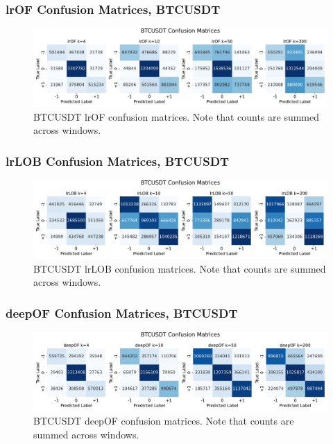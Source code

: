 \documentclass[handout]{beamer}
\begin{document}
\begin{frame}
    \frametitle{lrOF Confusion Matrices, BTCUSDT}
    \begin{figure}[htpb!]
        \centering
        \includegraphics[width=1.0\textwidth]{./images/BTCUSDT_lrOF_confusion_matrices.pdf}
        \caption{BTCUSDT lrOF confusion matrices. Note that counts are summed across windows.}
    \end{figure}
\end{frame}

\begin{frame}
    \frametitle{lrLOB Confusion Matrices, BTCUSDT}
    \begin{figure}[htpb!]
        \centering
        \includegraphics[width=1.0\textwidth]{./images/BTCUSDT_lrLOB_confusion_matrices.pdf}
        \caption{BTCUSDT lrLOB confusion matrices. Note that counts are summed across windows.}
    \end{figure}
\end{frame}


\begin{frame}
    \frametitle{deepOF Confusion Matrices, BTCUSDT}
    \begin{figure}[htpb!]
        \centering
        \includegraphics[width=1.0\textwidth]{./images/BTCUSDT_deepOF_confusion_matrices.pdf}
        \caption{BTCUSDT deepOF confusion matrices. Note that counts are summed across windows.}
    \end{figure}
\end{frame}
\end{document}
